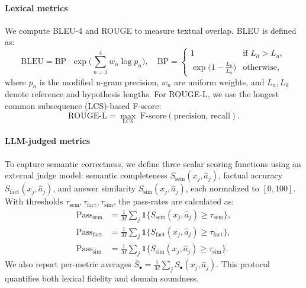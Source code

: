 \documentclass[]{interact}
\theoremstyle{plain}%
\theoremstyle{definition}
\theoremstyle{remark}
\begin{document}
\paragraph{Lexical metrics} We compute BLEU-4 and ROUGE to measure textual overlap. BLEU is defined as:
\begin{equation}
\mathrm{BLEU} = \mathrm{BP} \cdot \exp\Big(\sum_{n=1}^{4} w_n \log p_n\Big),\quad \mathrm{BP} = \begin{cases}
1 & \text{if } L_{\hat{a}} > L_a,\\
\exp\big(1 - \tfrac{L_a}{L_{\hat{a}}}\big) & \text{otherwise,}
\end{cases}
\end{equation}
where \(p_n\) is the modified n-gram precision, \(w_n\) are uniform weights, and \(L_a, L_{\hat{a}}\) denote reference and hypothesis lengths. For ROUGE-L, we use the longest common subsequence (LCS)-based F-score:
\begin{equation}
\mathrm{ROUGE\text{-}L} = \max_{\mathrm{LCS}} \; \mathrm{F}\text{-}\mathrm{score}(\mathrm{precision},\, \mathrm{recall}).
\end{equation}

\paragraph{LLM-judged metrics} To capture semantic correctness, we define three scalar scoring functions using an external judge model: semantic completeness \(S_{\mathrm{sem}}(x_j,\hat{a}_j)\), factual accuracy \(S_{\mathrm{fact}}(x_j,\hat{a}_j)\), and answer similarity \(S_{\mathrm{sim}}(x_j,\hat{a}_j)\), each normalized to \([0,100]\). With thresholds \(\tau_{\mathrm{sem}}, \tau_{\mathrm{fact}}, \tau_{\mathrm{sim}}\), the pass-rates are calculated as:
\begin{align}
\mathrm{Pass}_{\mathrm{sem}} &= \frac{1}{M}\sum_{j} \mathbf{1}\bigl\{S_{\mathrm{sem}}(x_j,\hat{a}_j)\ge \tau_{\mathrm{sem}}\bigr\},\\[2pt]
\mathrm{Pass}_{\mathrm{fact}} &= \frac{1}{M}\sum_{j} \mathbf{1}\bigl\{S_{\mathrm{fact}}(x_j,\hat{a}_j)\ge \tau_{\mathrm{fact}}\bigr\},\\[2pt]
\mathrm{Pass}_{\mathrm{sim}}  &= \frac{1}{M}\sum_{j} \mathbf{1}\bigl\{S_{\mathrm{sim}}(x_j,\hat{a}_j)\ge \tau_{\mathrm{sim}}\bigr\}.
\end{align}
We also report per-metric averages \(\overline{S}_{\bullet} = \tfrac{1}{M}\sum_j S_{\bullet}(x_j,\hat{a}_j)\). This protocol quantifies both lexical fidelity and domain soundness.
\end{document}
